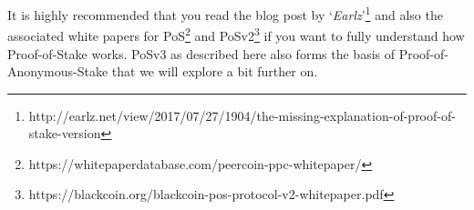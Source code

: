 It is highly recommended that you read the blog post by
‘\textit{Earlz}’\footnote{http://earlz.net/view/2017/07/27/1904/the-missing-explanation-of-proof-of-stake-version} 
and also the associated white papers for
PoS\footnote{https://whitepaperdatabase.com/peercoin-ppc-whitepaper/} and
PoSv2\footnote{https://blackcoin.org/blackcoin-pos-protocol-v2-whitepaper.pdf} 
if you want to fully understand how Proof-of-Stake works. PoSv3 as described 
here also forms the basis of Proof-of-Anonymous-Stake that we will explore a 
bit further on.
